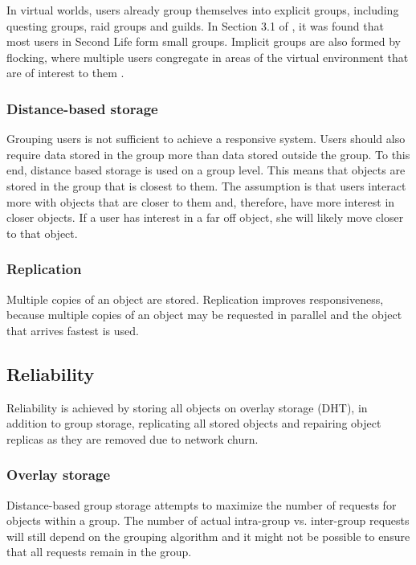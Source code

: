 In virtual worlds, users already group themselves into explicit groups, including questing groups, raid groups and guilds. In Section 3.1 of \cite{varvello_phd}, it was found that most users in Second Life form small groups.  Implicit groups are also formed by flocking, where multiple users congregate in areas of the virtual environment that are of interest to them \cite{flocking}.

\subsubsection{Distance-based storage}
Grouping users is not sufficient to achieve a responsive system. Users should also require data stored in the group more than data stored outside the group. To this end, distance based storage is used on a group level. This means that objects are stored in the group that is closest to them. The assumption is that users interact more with objects that are closer to them and, therefore, have more interest in closer objects. If a user has interest in a far off object, she will likely move closer to that object.

\subsubsection{Replication}

Multiple copies of an object are stored. Replication improves responsiveness, because multiple copies of an object may be requested in parallel and the object that arrives fastest is used.

\subsection{Reliability}

Reliability is achieved by storing all objects on overlay storage (DHT), in addition to group storage, replicating all stored objects and repairing object replicas as they are removed due to network churn.

\subsubsection{Overlay storage}
Distance-based group storage attempts to maximize the number of requests for objects within a group. The number of actual intra-group vs. inter-group requests will still depend on the grouping algorithm and it might not be possible to ensure that all requests remain in the group.

